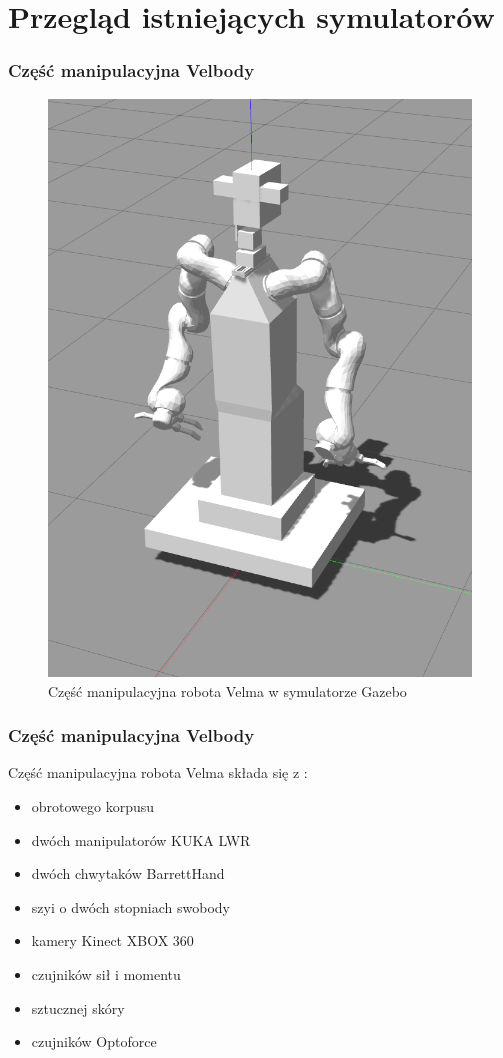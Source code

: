 \section{Przegląd istniejących symulatorów} 

\begin{frame}
    \frametitle{Część manipulacyjna Velbody}
    \begin{figure}
        \includegraphics[scale=0.20]{./images/velma_gz_cropped.png}
        \caption{\normalsize{Część manipulacyjna robota Velma w symulatorze Gazebo}}
    \end{figure}
\end{frame}

\begin{frame}
    \frametitle{Część manipulacyjna Velbody}
    Część manipulacyjna robota Velma składa się z \cite{docsVelma}:  
    \begin{itemize}
        \item obrotowego korpusu
        \item dwóch manipulatorów KUKA LWR
        \item dwóch chwytaków BarrettHand
        \item szyi o dwóch stopniach swobody
        \item kamery Kinect XBOX 360
        \item czujników sił i momentu
        \item sztucznej skóry
        \item czujników Optoforce
    \end{itemize}
\end{frame}

